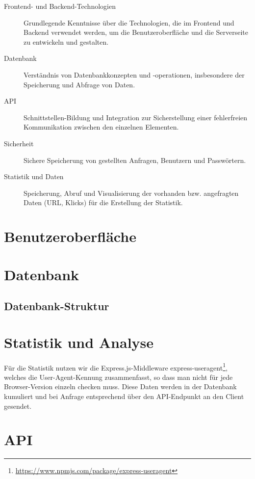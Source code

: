 \documentclass[a4paper,11pt,DIV=12,overfullrule=on]{scrreprt}
\begin{document}
\begin{description}
    \item[Frontend- und Backend-Technologien] Grundlegende Kenntnisse über die Technologien, die im Frontend und Backend verwendet werden, um die Benutzeroberfläche und die Serverseite zu entwickeln und gestalten.

    \item[Datenbank] Verständnis von Datenbankkonzepten und -operationen, insbesondere der Speicherung und Abfrage von Daten.

    \item[API] Schnittstellen-Bildung und Integration zur Sicherstellung einer fehlerfreien Kommunikation zwischen den einzelnen Elementen.

    \item[Sicherheit] Sichere Speicherung von gestellten Anfragen, Benutzern und Passwörtern.

    \item[Statistik und Daten] Speicherung, Abruf und Visualisierung der vorhanden bzw. angefragten Daten (URL, Klicks) für die Erstellung der Statistik.
\end{description}

\section{Benutzeroberfläche}
\section{Datenbank}
\subsection{Datenbank-Struktur}
\section{Statistik und Analyse}
Für die Statistik nutzen wir die Express.js-Middleware {\ttfamily express-useragent}\footnote{\href{https://www.npmjs.com/package/express-useragent}{https://www.npmjs.com/package/express-useragent}}, welches die User-Agent-Kennung zusammenfasst, so dass man nicht für jede Browser-Version einzeln checken muss. Diese Daten werden in der Datenbank kumuliert und bei Anfrage entsprechend über den API-Endpunkt an den Client gesendet.

\section{API}
\end{document}
